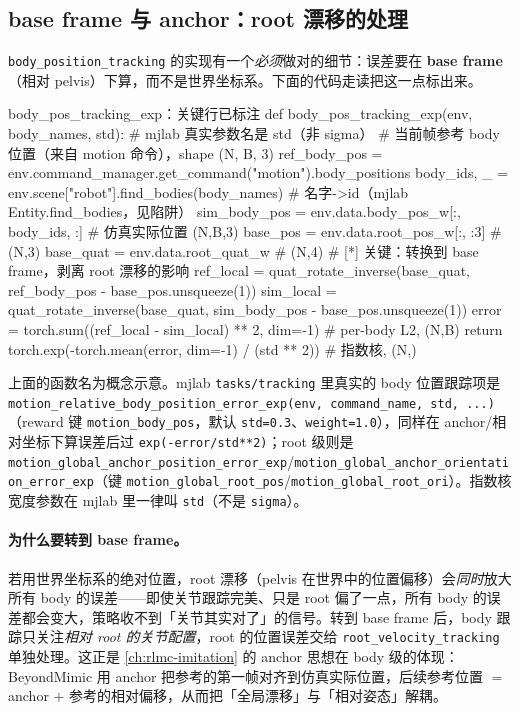 \subsection{base frame 与 anchor：root 漂移的处理}
\label{sec:rlmc-mi-mjlab-baseframe}

\verb|body_position_tracking| 的实现有一个\emph{必须}做对的细节：误差要在 \textbf{base frame}（相对 pelvis）下算，而不是世界坐标系。下面的代码走读把这一点标出来。

\begin{codebox}[Python]{body\_pos\_tracking\_exp：关键行已标注}
def body_pos_tracking_exp(env, body_names, std):                    # mjlab 真实参数名是 std（非 sigma）
    # 当前帧参考 body 位置（来自 motion 命令），shape (N, B, 3)
    ref_body_pos = env.command_manager.get_command("motion").body_positions
    body_ids, _ = env.scene["robot"].find_bodies(body_names)         # 名字->id（mjlab Entity.find_bodies，见陷阱）
    sim_body_pos = env.data.body_pos_w[:, body_ids, :]               # 仿真实际位置 (N,B,3)
    base_pos  = env.data.root_pos_w[:, :3]                           # (N,3)
    base_quat = env.data.root_quat_w                                 # (N,4)
    # [*] 关键：转换到 base frame，剥离 root 漂移的影响
    ref_local = quat_rotate_inverse(base_quat, ref_body_pos - base_pos.unsqueeze(1))
    sim_local = quat_rotate_inverse(base_quat, sim_body_pos - base_pos.unsqueeze(1))
    error = torch.sum((ref_local - sim_local) ** 2, dim=-1)         # per-body L2, (N,B)
    return torch.exp(-torch.mean(error, dim=-1) / (std ** 2))       # 指数核, (N,)
\end{codebox}

\begin{note}
上面的函数名为概念示意。mjlab \verb|tasks/tracking| 里真实的 body 位置跟踪项是 \verb|motion_relative_body_position_error_exp(env, command_name, std, ...)|（reward 键 \verb|motion_body_pos|，默认 \verb|std=0.3|、\verb|weight=1.0|），同样在 anchor/相对坐标下算误差后过 \verb|exp(-error/std**2)|；root 级则是 \verb|motion_global_anchor_position_error_exp|/\verb|motion_global_anchor_orientation_error_exp|（键 \verb|motion_global_root_pos|/\verb|motion_global_root_ori|）。指数核宽度参数在 mjlab 里一律叫 \verb|std|（不是 \verb|sigma|）。
\end{note}

\paragraph{为什么要转到 base frame。}若用世界坐标系的绝对位置，root 漂移（pelvis 在世界中的位置偏移）会\emph{同时}放大所有 body 的误差——即使关节跟踪完美、只是 root 偏了一点，所有 body 的误差都会变大，策略收不到「关节其实对了」的信号。转到 base frame 后，body 跟踪只关注\emph{相对 root 的关节配置}，root 的位置误差交给 \verb|root_velocity_tracking| 单独处理。这正是 \cref{ch:rlmc-imitation} 的 anchor 思想在 body 级的体现：BeyondMimic 用 anchor 把参考的第一帧对齐到仿真实际位置，后续参考位置 $=$ anchor $+$ 参考的相对偏移，从而把「全局漂移」与「相对姿态」解耦。

